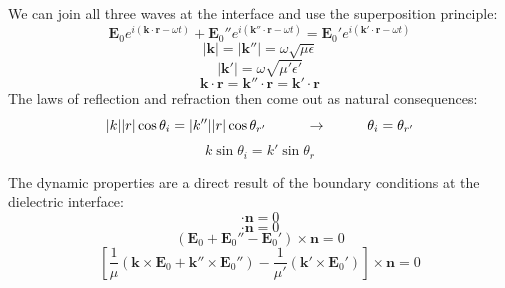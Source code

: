 \documentclass{beamer}
\begin{document}
\begin{frame}
	
	

We can join all three waves at the interface and use the superposition principle:	
\begin{equation}\label{superp}
	\mathbf{E}_{0} e^{i (\mathbf{k} \cdot \mathbf{r} - \omega t)} + \mathbf{E}_{0}'' e^{i (\mathbf{k}'' \cdot \mathbf{r} - \omega t)} = \mathbf{E}_{0}' e^{i (\mathbf{k}' \cdot \mathbf{r} - \omega t)}
\end{equation}
\begin{equation}\label{k1}
	|\mathbf{k}| = |\mathbf{k}''| = \omega \sqrt{\mu \epsilon}
\end{equation}
\begin{equation}\label{k2}
	|\mathbf{k}'| = \omega \sqrt{\mu' \epsilon'}
\end{equation}
\begin{equation}
	\mathbf{k} \cdot \mathbf{r} =  \mathbf{k}'' \cdot \mathbf{r} = \mathbf{k}' \cdot \mathbf{r}
\end{equation}
The laws of reflection and refraction then come out as natural consequences:
\begin{equation}
	|k||r| \cos \theta_{i} = |k''||r| \cos \theta_{r'} \hspace{10mm} \rightarrow \hspace{10mm}\theta_{i} = \theta_{r'}
\end{equation}
\begin{equation}
	k \sin \theta_{i} = k' \sin \theta_{r}
\end{equation} 



\end{frame}






\begin{frame}
	
	
	
The dynamic properties are a direct result of the boundary conditions at the dielectric interface:	
\begin{equation}
	[ \epsilon (\mathbf{E}_{0} + \mathbf{E}_{0}'') - \epsilon' \mathbf{E}_{0}' ] \cdot \mathbf{n} = 0
\end{equation}
\begin{equation}
	[ \mathbf{k} \times \mathbf{E}_{0} + \mathbf{k}'' \times \mathbf{E}_{0}'' - \mathbf{k}' \times \mathbf{E}_{0}' ] \cdot \mathbf{n} = 0
\end{equation}
\begin{equation}
	(\mathbf{E}_{0} + \mathbf{E}_{0}'' - \mathbf{E}_{0}' ) \times \mathbf{n} = 0
\end{equation}
\begin{equation}
	\left[ \frac{1}{\mu} ( \mathbf{k} \times \mathbf{E}_{0} + \mathbf{k}'' \times \mathbf{E}_{0}'' ) - \frac{1}{\mu'} ( \mathbf{k}' \times \mathbf{E}_{0}') \right] \times \mathbf{n} = 0
\end{equation}

	
	
\end{frame}
\end{document}
